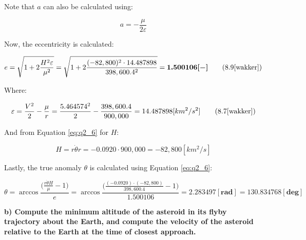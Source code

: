 \noindent Note that $a$ can also be calculated using:

\begin{equation}
    a = - \frac{\mu}{2\varepsilon}
    \label{eq:q3_a4}
\end{equation}

\noindent Now, the eccentricity is calculated:

\begin{equation}
    e = \sqrt{1 + 2 \frac{H^2 \varepsilon}{\mu^2}} = \sqrt{1 + 2 \frac{(-82,800)^2 \cdot 14.487898}{398,600.4^2}} = \boldsymbol{1.500106 [-]}
    \tag{8.9\cite{wakker}}
    \label{eq:q3_a5}
\end{equation}

\noindent Where:

\begin{equation}
    \varepsilon = \frac{V^2}{2} - \frac{\mu}{r} = \frac{5.464574^2}{2} - \frac{398,600.4}{900,000} = 14.487898 [km^2/s^2]
    \tag{8.7\cite{wakker}}
    \label{eq:q3_a6}
\end{equation}

\noindent And from Equation \ref{eq:q2_6} for $H$:

\begin{equation}
    H = r\dot{\theta} r = -0.0920 \cdot 900,000 = -82,800 [km^2/s]
    \label{eq:q3_a7}
\end{equation}

\noindent Lastly, the true anomaly $\theta$ is calculated using Equation \ref{eq:q2_6}:

\begin{equation}
    \theta = \arccos{\frac{\big( \frac{r \dot{\theta} H}{\mu} -1 \big)}{e}} = \arccos{\frac{\big( \frac{(-0.0920) \cdot (-82,800)}{398,600.4} -1 \big)}{1.500106}} = \boldsymbol{2.283497 [rad] = 130.834768 [deg]}
    \label{eq:q3_a8}
\end{equation}










\noindent \textbf{b) Compute the minimum altitude of the asteroid in its flyby trajectory about the Earth, and compute the velocity of the asteroid relative to the Earth at the time of closest approach.}

